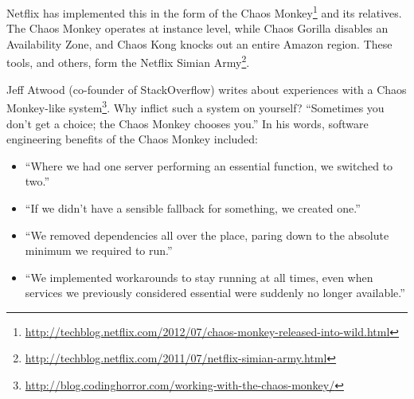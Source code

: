 \documentclass[11pt]{article}
\begin{document}
Netflix has implemented this in the form of the Chaos
Monkey\footnote{\url{http://techblog.netflix.com/2012/07/chaos-monkey-released-into-wild.html}}
and its relatives. The Chaos Monkey operates at instance level, while
Chaos Gorilla disables an Availability Zone, and Chaos Kong knocks out
an entire Amazon region. These tools, and others, form the Netflix
Simian
Army\footnote{\url{http://techblog.netflix.com/2011/07/netflix-simian-army.html}}.

Jeff Atwood (co-founder of StackOverflow) writes about experiences with a Chaos Monkey-like system\footnote{\url{http://blog.codinghorror.com/working-with-the-chaos-monkey/}}. Why inflict such a system on yourself? ``Sometimes you don't get a choice; the Chaos Monkey chooses you.'' In his words, software engineering benefits of the Chaos Monkey included:

\begin{itemize}
\item    ``Where we had one server performing an essential function, we switched to two.''
\item    ``If we didn't have a sensible fallback for something, we created one.''
\item    ``We removed dependencies all over the place, paring down to the absolute minimum we required to run.''
\item     ``We implemented workarounds to stay running at all times, even when services we previously considered essential were suddenly no longer available.''
\end{itemize}


\end{document}
